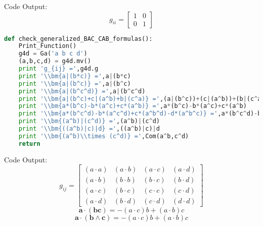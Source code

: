 \documentclass[10pt,fleqn]{report}
\newcommand{\W}{\wedge}
\begin{document}
Code Output:
\begin{equation*} g_{ii} = \left[\begin{matrix}1 & 0\\0 & 1\end{matrix}\right] \end{equation*}
\begin{lstlisting}[language=Python,showspaces=false,showstringspaces=false,backgroundcolor=\color{gray},frame=single]
def check_generalized_BAC_CAB_formulas():
    Print_Function()
    g4d = Ga('a b c d')
    (a,b,c,d) = g4d.mv()
    print 'g_{ij} =',g4d.g
    print '\\bm{a|(b*c)} =',a|(b*c)
    print '\\bm{a|(b^c)} =',a|(b^c)
    print '\\bm{a|(b^c^d)} =',a|(b^c^d)
    print '\\bm{a|(b^c)+c|(a^b)+b|(c^a)} =',(a|(b^c))+(c|(a^b))+(b|(c^a))
    print '\\bm{a*(b^c)-b*(a^c)+c*(a^b)} =',a*(b^c)-b*(a^c)+c*(a^b)
    print '\\bm{a*(b^c^d)-b*(a^c^d)+c*(a^b^d)-d*(a^b^c)} =',a*(b^c^d)-b*(a^c^d)+c*(a^b^d)-d*(a^b^c)
    print '\\bm{(a^b)|(c^d)} =',(a^b)|(c^d)
    print '\\bm{((a^b)|c)|d} =',((a^b)|c)|d
    print '\\bm{(a^b)\\times (c^d)} =',Com(a^b,c^d)
    return
\end{lstlisting}
Code Output:
\begin{equation*} g_{ij} = \left[\begin{matrix}\left ( a\cdot a\right )  & \left ( a\cdot b\right )  & \left ( a\cdot c\right )  & \left ( a\cdot d\right ) \\\left ( a\cdot b\right )  & \left ( b\cdot b\right )  & \left ( b\cdot c\right )  & \left ( b\cdot d\right ) \\\left ( a\cdot c\right )  & \left ( b\cdot c\right )  & \left ( c\cdot c\right )  & \left ( c\cdot d\right ) \\\left ( a\cdot d\right )  & \left ( b\cdot d\right )  & \left ( c\cdot d\right )  & \left ( d\cdot d\right ) \end{matrix}\right] \end{equation*}
\begin{equation*} \bm{a\cdot (b c)} = - \left ( a\cdot c\right )  b + \left ( a\cdot b\right )  c \end{equation*}
\begin{equation*} \bm{a\cdot (b\W c)} = - \left ( a\cdot c\right )  b + \left ( a\cdot b\right )  c \end{equation*}
\end{document}

